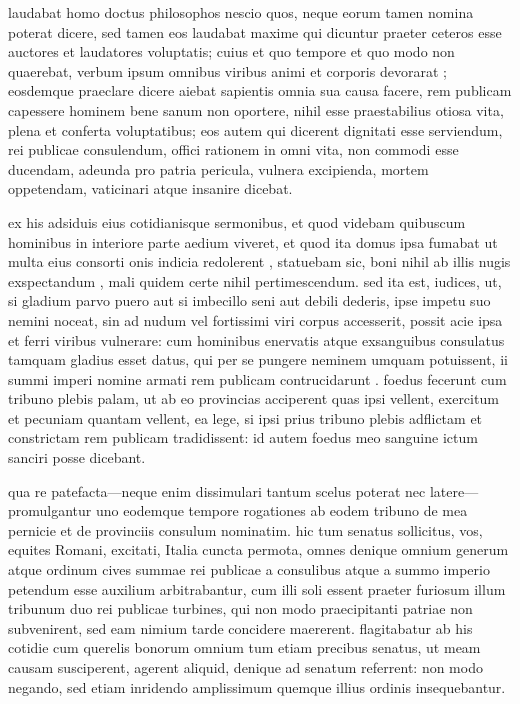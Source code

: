  laudabat homo doctus philosophos nescio quos, neque eorum tamen nomina poterat dicere, sed tamen eos laudabat maxime qui dicuntur praeter ceteros esse auctores et laudatores voluptatis; cuius et quo tempore et quo modo non quaerebat, verbum ipsum omnibus viribus animi et corporis devorarat ; eosdemque praeclare dicere aiebat sapientis omnia sua causa facere, rem publicam capessere hominem bene sanum non oportere, nihil esse praestabilius otiosa vita, plena et conferta voluptatibus; eos autem qui dicerent dignitati esse serviendum, rei publicae consulendum, offici rationem in omni vita, non commodi esse ducendam, adeunda pro patria pericula, vulnera excipienda, mortem oppetendam, vaticinari atque insanire dicebat.

 ex his adsiduis eius cotidianisque sermonibus, et quod videbam quibuscum hominibus in interiore parte aedium viveret, et quod ita domus ipsa fumabat ut multa eius consorti onis indicia redolerent , statuebam sic, boni nihil ab illis nugis exspectandum , mali quidem certe nihil pertimescendum. sed ita est, iudices, ut, si gladium parvo puero aut si imbecillo seni aut debili dederis, ipse impetu suo nemini noceat, sin ad nudum vel fortissimi viri corpus accesserit, possit acie ipsa et ferri viribus vulnerare: cum hominibus enervatis atque exsanguibus consulatus tamquam gladius esset datus, qui per se pungere neminem umquam potuissent, ii summi imperi nomine armati rem publicam contrucidarunt . foedus fecerunt cum tribuno plebis palam, ut ab eo provincias acciperent quas ipsi vellent, exercitum et pecuniam quantam vellent, ea lege, si ipsi prius tribuno plebis adflictam et constrictam rem publicam tradidissent: id autem foedus meo sanguine ictum sanciri posse dicebant.

 qua re patefacta—neque enim dissimulari tantum scelus poterat nec latere—promulgantur uno eodemque tempore rogationes ab eodem tribuno de mea pernicie et de provinciis consulum nominatim. hic tum senatus sollicitus, vos, equites Romani, excitati, Italia cuncta permota, omnes denique omnium generum atque ordinum cives summae rei publicae a consulibus atque a summo imperio petendum esse auxilium arbitrabantur, cum illi soli essent praeter furiosum illum tribunum duo rei publicae turbines, qui non modo praecipitanti patriae non subvenirent, sed eam nimium tarde concidere maererent. flagitabatur ab his cotidie cum querelis bonorum omnium tum etiam precibus senatus, ut meam causam susciperent, agerent aliquid, denique ad senatum referrent: non modo negando, sed etiam inridendo amplissimum quemque illius ordinis insequebantur.

